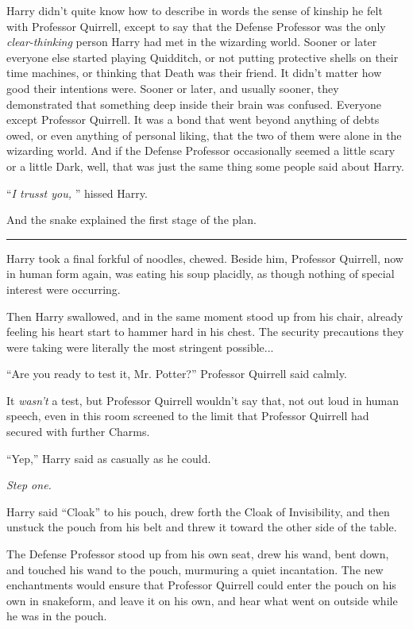Harry didn't quite know how to describe in words the sense of kinship he
felt with Professor Quirrell, except to say that the Defense Professor
was the only \emph{clear-thinking} person Harry had met in the wizarding
world. Sooner or later everyone else started playing Quidditch, or not
putting protective shells on their time machines, or thinking that Death
was their friend. It didn't matter how good their intentions were.
Sooner or later, and usually sooner, they demonstrated that something
deep inside their brain was confused. Everyone except Professor
Quirrell. It was a bond that went beyond anything of debts owed, or even
anything of personal liking, that the two of them were alone in the
wizarding world. And if the Defense Professor occasionally seemed a
little scary or a little Dark, well, that was just the same thing some
people said about Harry.

``\emph{I trusst you,} '' hissed Harry.

And the snake explained the first stage of the plan.

\begin{center}\rule{3in}{0.4pt}\end{center}

Harry took a final forkful of noodles, chewed. Beside him, Professor
Quirrell, now in human form again, was eating his soup placidly, as
though nothing of special interest were occurring.

Then Harry swallowed, and in the same moment stood up from his chair,
already feeling his heart start to hammer hard in his chest. The
security precautions they were taking were literally the most stringent
possible...

``Are you ready to test it, Mr. Potter?'' Professor Quirrell said
calmly.

It \emph{wasn't} a test, but Professor Quirrell wouldn't say that, not
out loud in human speech, even in this room screened to the limit that
Professor Quirrell had secured with further Charms.

``Yep,'' Harry said as casually as he could.

\emph{Step one.}

Harry said ``Cloak'' to his pouch, drew forth the Cloak of Invisibility,
and then unstuck the pouch from his belt and threw it toward the other
side of the table.

The Defense Professor stood up from his own seat, drew his wand, bent
down, and touched his wand to the pouch, murmuring a quiet incantation.
The new enchantments would ensure that Professor Quirrell could enter
the pouch on his own in snakeform, and leave it on his own, and hear
what went on outside while he was in the pouch.

